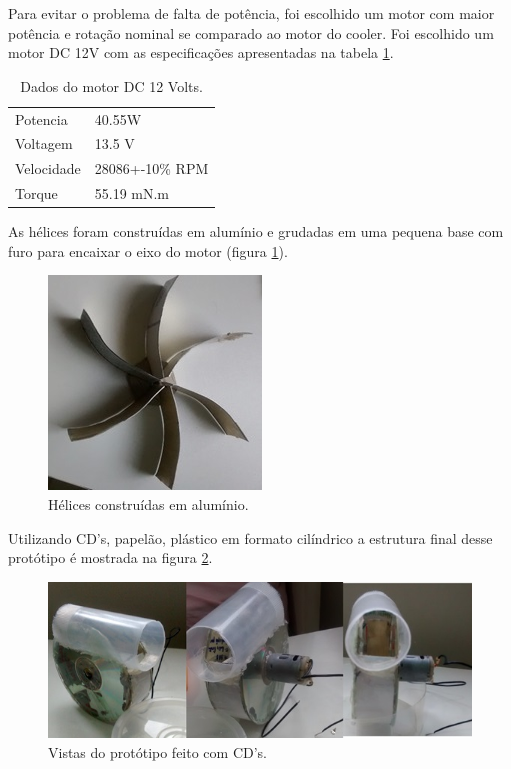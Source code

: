		Para evitar o problema de falta de potência, foi escolhido um motor com maior potência e rotação nominal se comparado ao motor do cooler. Foi escolhido um motor DC 12V com as especificações apresentadas na tabela \ref{tab:motor_12V}.

		\begin{table}[H]
			\centering
			\caption{Dados do motor DC 12 Volts.}
			\label{tab:motor_12V}
			\begin{tabular}{ll}
				Potencia   & 40.55W          \\
				Voltagem   & 13.5 V          \\
				Velocidade & 28086+-10\% RPM \\
				Torque     & 55.19 mN.m     
			\end{tabular}
		\end{table}

		As hélices foram construídas em alumínio e grudadas em uma pequena base com furo para encaixar o eixo do motor (figura \ref{img:hélices_alumínio}).

		\begin{figure}[H]
			\centering
			\includegraphics[scale=1]{figuras/asppc2_7.jpg}
			\caption{Hélices construídas em alumínio.}
			\label{img:hélices_alumínio}
		\end{figure}

		Utilizando CD’s, papelão, plástico em formato cilíndrico a estrutura final desse protótipo é mostrada na figura \ref{img:protótipo_CD}.  

		\begin{figure}[H]
			\centering
			\includegraphics[scale=1]{figuras/asppc2_8.jpg}
			\caption{Vistas do protótipo feito com CD’s.}
			\label{img:protótipo_CD}
		\end{figure}

